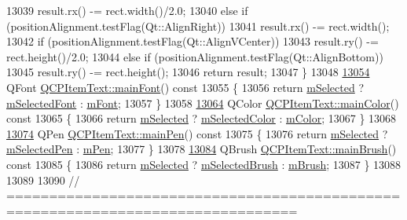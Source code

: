 \begin{DoxyCode}
13039     result.rx() -= rect.width()/2.0;
13040   \textcolor{keywordflow}{else} \textcolor{keywordflow}{if} (positionAlignment.testFlag(Qt::AlignRight))
13041     result.rx() -= rect.width();
13042   \textcolor{keywordflow}{if} (positionAlignment.testFlag(Qt::AlignVCenter))
13043     result.ry() -= rect.height()/2.0;
13044   \textcolor{keywordflow}{else} \textcolor{keywordflow}{if} (positionAlignment.testFlag(Qt::AlignBottom))
13045     result.ry() -= rect.height();
13046   \textcolor{keywordflow}{return} result;
13047 \}
13048 
\hypertarget{a00115_source_l13054}{}\hyperlink{a00041_a23d391bd6471c45e73f45add67ede902}{13054} QFont \hyperlink{a00041_a23d391bd6471c45e73f45add67ede902}{QCPItemText::mainFont}()\textcolor{keyword}{ const}
13055 \textcolor{keyword}{}\{
13056   \textcolor{keywordflow}{return} \hyperlink{a00022_a4bdb3457dad1d268c0f78a44152b9645}{mSelected} ? \hyperlink{a00041_a6702f141fae590b2f4f1ec02fe9f8bd5}{mSelectedFont} : \hyperlink{a00041_a1dc87fe2a824820d549ffd7e644eef8d}{mFont};
13057 \}
13058 
\hypertarget{a00115_source_l13064}{}\hyperlink{a00041_ad7bf17e4945cc86bbf9a36331da059a0}{13064} QColor \hyperlink{a00041_ad7bf17e4945cc86bbf9a36331da059a0}{QCPItemText::mainColor}()\textcolor{keyword}{ const}
13065 \textcolor{keyword}{}\{
13066   \textcolor{keywordflow}{return} \hyperlink{a00022_a4bdb3457dad1d268c0f78a44152b9645}{mSelected} ? \hyperlink{a00041_a7eb64e42f5f7998a97d8907ad25933c1}{mSelectedColor} : \hyperlink{a00041_a8407f284ad867f627878cc26ef433d08}{mColor};
13067 \}
13068 
\hypertarget{a00115_source_l13074}{}\hyperlink{a00041_a9ade32d362b22853659201c738269e2a}{13074} QPen \hyperlink{a00041_a9ade32d362b22853659201c738269e2a}{QCPItemText::mainPen}()\textcolor{keyword}{ const}
13075 \textcolor{keyword}{}\{
13076   \textcolor{keywordflow}{return} \hyperlink{a00022_a4bdb3457dad1d268c0f78a44152b9645}{mSelected} ? \hyperlink{a00041_a8eaec649606d6ead2d8d4dcb5691777c}{mSelectedPen} : \hyperlink{a00041_aa02388705dbbff1bf7b8aa872b5f579c}{mPen};
13077 \}
13078 
\hypertarget{a00115_source_l13084}{}\hyperlink{a00041_a10d6585a030633aa79d5ebc5a437f183}{13084} QBrush \hyperlink{a00041_a10d6585a030633aa79d5ebc5a437f183}{QCPItemText::mainBrush}()\textcolor{keyword}{ const}
13085 \textcolor{keyword}{}\{
13086   \textcolor{keywordflow}{return} \hyperlink{a00022_a4bdb3457dad1d268c0f78a44152b9645}{mSelected} ? \hyperlink{a00041_a28ccd097b42a216d81db9c6869f54a59}{mSelectedBrush} : \hyperlink{a00041_a2535911875faa459b8337f2efccb5cb8}{mBrush};
13087 \}
13088 
13089 
13090 \textcolor{comment}{// ================================================================================}

\end{DoxyCode}
